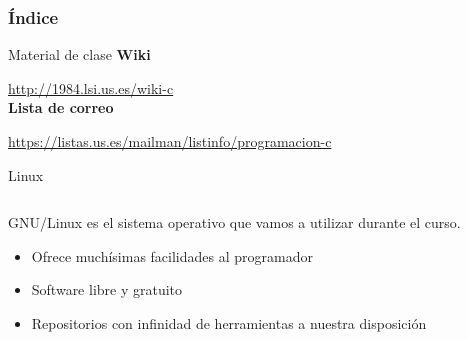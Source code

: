 \documentclass{mybeamer}
\institute{
	{\textsl{\large Tema 2}}
	\\[1em]
	\textbf{\Large Configurando entorno de trabajo}
}
\begin{document}
\begin{frame}
\titlepage
\end{frame}

\begin{frame}
\frametitle{Índice}
\tableofcontents
\end{frame}

\begin{framesec}{Material de clase}
	\textbf{\Large Wiki}

	{\small \url{http://1984.lsi.us.es/wiki-c}}
	\\[2em]
	\textbf{\Large Lista de correo}

	{\small \url{https://listas.us.es/mailman/listinfo/programacion-c}}
\end{framesec}

\begin{framesec}{Linux}
	\begin{minipage}[0.2\textheight]{\textwidth}
	\begin{columns}[c]
		\begin{column}{0.8\textwidth}
		GNU/Linux es el sistema operativo que vamos a utilizar durante
		el curso.

		\begin{itemize}
			\item Ofrece muchísimas facilidades al programador
			\item Software libre y gratuito
			\item Repositorios con infinidad de herramientas a
				nuestra disposición
		\end{itemize}
		\end{column}

		\begin{column}{0.2\textwidth}
		\end{column}
	\end{columns}
	\end{minipage}
\end{framesec}
\end{document}
